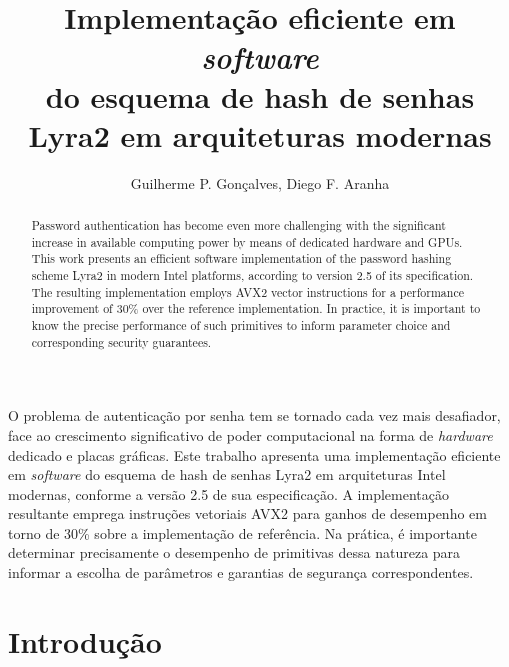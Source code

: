\documentclass{article}
\begin{document}
\title{Implementação eficiente em \emph{software}\\ do esquema de hash de senhas Lyra2 em arquiteturas modernas}

\author{Guilherme P. Gonçalves, Diego F. Aranha}

\address{Laboratório de Segurança e Criptografia (LASCA)\\
	Instituto de Computação (IC) -- Universidade Estadual de Campinas (Unicamp)\\
	Av. Albert Einsten, 1251 -- Campinas -- SP -- Brasil
}

\maketitle

\begin{abstract}
Password authentication has become even more challenging with the significant increase
in available computing power by means of dedicated hardware and GPUs. This work
presents an efficient software implementation of the password hashing scheme Lyra2 in modern Intel platforms,
according to version 2.5 of its specification. The resulting implementation employs
AVX2 vector instructions for a performance improvement of 30\% over the reference
implementation. In practice, it is important to know the precise performance of such primitives to inform
parameter choice and corresponding security guarantees.
\end{abstract}

\begin{resumo}
O problema de autenticação por senha tem se tornado cada vez mais desafiador, face ao crescimento
significativo de poder computacional na forma de \emph{hardware} dedicado e placas gráficas.
Este trabalho apresenta uma implementação eficiente em \emph{software} do esquema de hash de senhas Lyra2 em arquiteturas Intel modernas,
conforme a versão 2.5 de sua especificação. A implementação resultante emprega instruções vetoriais AVX2
para ganhos de desempenho em torno de 30\% sobre a implementação de referência. Na prática, é importante
determinar precisamente o desempenho de primitivas dessa natureza para informar a escolha de parâmetros
e garantias de segurança correspondentes.
\end{resumo}

\section{Introdução}
\end{document}
